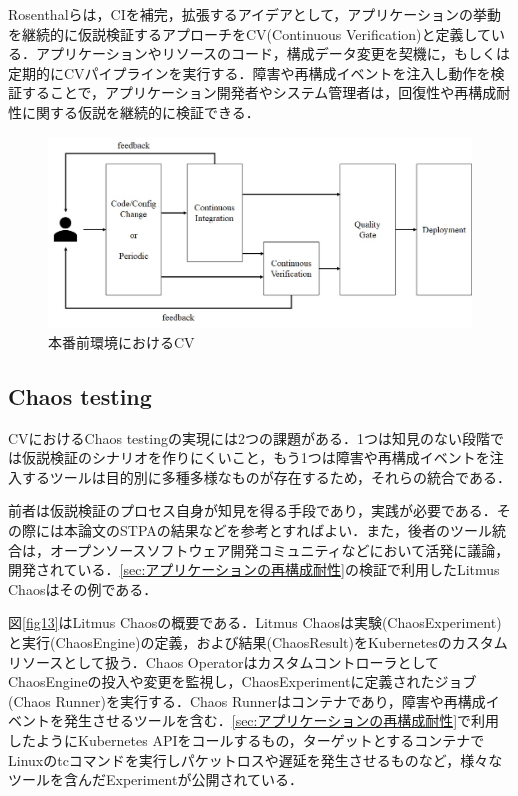 \documentclass[12pt,a4j]{ujreport}
\begin{document}
Rosenthalらは，CIを補完，拡張するアイデアとして，アプリケーションの挙動を継続的に仮説検証するアプローチをCV(Continuous Verification)と定義している\cite{ref46}．アプリケーションやリソースのコード，構成データ変更を契機に，もしくは定期的にCVパイプラインを実行する．障害や再構成イベントを注入し動作を検証することで，アプリケーション開発者やシステム管理者は，回復性や再構成耐性に関する仮説を継続的に検証できる．
\begin{figure}[tb]
    \centerline{\includegraphics[clip,width=140mm]{images/cv-in-pre-production.jpg}}
    \caption{本番前環境におけるCV}\label{fig12}
\end{figure}

\subsection{Chaos testing}
CVにおけるChaos testingの実現には2つの課題がある．1つは知見のない段階では仮説検証のシナリオを作りにくいこと，もう1つは障害や再構成イベントを注入するツールは目的別に多種多様なものが存在するため，それらの統合である．

前者は仮説検証のプロセス自身が知見を得る手段であり，実践が必要である．その際には本論文のSTPAの結果などを参考とすればよい．また，後者のツール統合は，オープンソースソフトウェア開発コミュニティなどにおいて活発に議論，開発されている．\ref{sec:アプリケーションの再構成耐性}の検証で利用したLitmus Chaosはその例である．

図\ref{fig13}はLitmus Chaosの概要である．Litmus Chaosは実験(ChaosExperiment)と実行(ChaosEngine)の定義，および結果(ChaosResult)をKubernetesのカスタムリソースとして扱う．Chaos OperatorはカスタムコントローラとしてChaosEngineの投入や変更を監視し，ChaosExperimentに定義されたジョブ(Chaos Runner)を実行する．Chaos Runnerはコンテナであり，障害や再構成イベントを発生させるツールを含む．\ref{sec:アプリケーションの再構成耐性}で利用したようにKubernetes APIをコールするもの，ターゲットとするコンテナでLinuxのtcコマンド\cite{ref47}を実行しパケットロスや遅延を発生させるものなど，様々なツールを含んだExperimentが公開されている．
\end{document}

